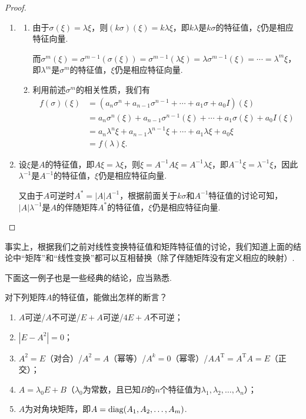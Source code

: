 \begin{proof}
\begin{enumerate}
    \item
    \begin{enumerate}
        \item 由于$\sigma(\xi)=\lambda\xi$，则$(k\sigma)(\xi)=k\lambda\xi$，即$k\lambda$是$k\sigma$的特征值，$\xi$仍是相应特征向量.

        而$\sigma^m(\xi)=\sigma^{m-1}(\sigma(\xi))=\sigma^{m-1}(\lambda\xi)=\lambda\sigma^{m-1}(\xi)=\cdots=\lambda^m\xi$，即$\lambda^m$是$\sigma^m$的特征值，$\xi$仍是相应特征向量.

        \item 利用前述$\sigma^m$的相关性质，我们有
        \begin{align*}
            f(\sigma)(\xi) &= (a_n\sigma^n+a_{n-1}\sigma^{n-1}+\cdots+a_1\sigma+a_0I)(\xi) \\
                           &= a_n\sigma^n(\xi)+a_{n-1}\sigma^{n-1}(\xi)+\cdots+a_1\sigma(\xi)+a_0I(\xi) \\
                           &= a_n\lambda^n\xi+a_{n-1}\lambda^{n-1}\xi+\cdots+a_1\lambda\xi+a_0\xi \\
                           &= f(\lambda)\xi.
        \end{align*}
    \end{enumerate}

    \item 设$\xi$是$A$的特征值，即$A\xi=\lambda\xi$，则$\xi=A^{-1}A\xi=A^{-1}\lambda\xi$，即$A^{-1}\xi=\lambda^{-1}\xi$，因此$\lambda^{-1}$是$A^{-1}$的特征值，$\xi$仍是相应特征向量.

    又由于$A$可逆时$A^*=|A|A^{-1}$，根据前面关于$k\sigma$和$A^{-1}$特征值的讨论可知，$|A|\lambda^{-1}$是$A$的伴随矩阵$A^*$的特征值，$\xi$仍是相应特征向量.
\end{enumerate}
\end{proof}

事实上，根据我们之前对线性变换特征值和矩阵特征值的讨论，我们知道上面的结论中``矩阵''和``线性变换''都可以互相替换（除了伴随矩阵没有定义相应的映射）.

下面这一例子也是一些经典的结论，应当熟悉.
\begin{example}\label{ex:18:特征值的性质}
    对下列矩阵$A$的特征值，能做出怎样的断言？
    \begin{enumerate}
        \item $A$可逆/$A$不可逆/$E+A$可逆/$4E+A$不可逆；

        \item $|E-A^2|=0$；

        \item $A^2=E$（对合）/$A^2=A$（幂等）/$A^k=0$（幂零）/$AA^\mathrm{T}=A^\mathrm{T}A=E$（正交）；

        \item $A=\lambda_0E+B$（$\lambda_0$为常数，且已知$B$的$n$个特征值为$\lambda_1,\lambda_2,\ldots,\lambda_n$）；

        \item $A$为对角块矩阵，即$A=\operatorname{diag}(A_1,A_2,\ldots,A_m)$.
    \end{enumerate}
\end{example}

